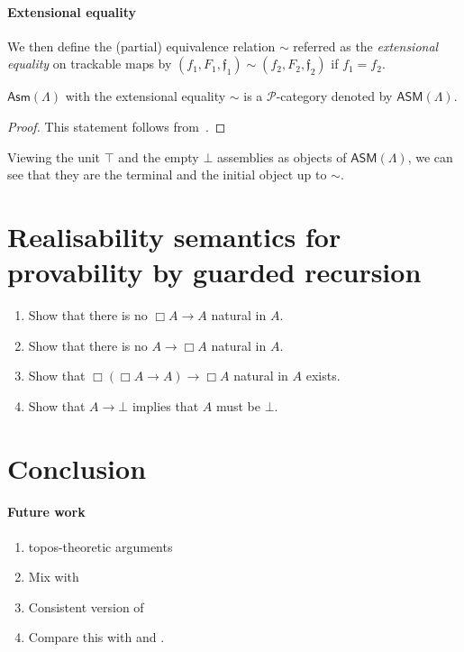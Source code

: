 \documentclass[a4paper,UKenglish,numberwithinsect,cleveref,thm-restate]{lipics-v2021}
\newcommand{\PP}{\mathscr{P}}
\newcommand{\Asm}{\mathsf{Asm}}
\newcommand{\ASM}{\mathsf{ASM}}
\theoremstyle{plain}
\begin{document}
\paragraph*{Extensional equality}
We then define the (partial) equivalence relation $\sim$ referred as the \emph{extensional equality} on trackable maps by $(f_1, F_1, \mathfrak{f}_1) \sim (f_2, F_2, \mathfrak{f}_2)$ if $f_1 = f_2$.
\begin{corollary}
  $\Asm(\Lambda)$ with the extensional equality $\sim$ is a $\PP$-category denoted by $\ASM(\Lambda)$.
\end{corollary}
\begin{proof}
  This statement follows from~.
\end{proof}

Viewing the unit $\top$ and the empty $\bot$ assemblies as objects of $\ASM(\Lambda)$, we can see that they are the terminal and the initial object up to $\sim$.

\section{Realisability semantics for provability by guarded recursion}\label{sec:provability}

\begin{enumerate}
  \item Show that there is no $\Box A \to A$ natural in $A$.
  \item Show that there is no $A \to \Box A$ natural in $A$.
  \item Show that $\Box (\Box A \to A) \to \Box A$ natural in $A$ exists.
  \item Show that $A \to \bot$ implies that $A$ must be $\bot$.
\end{enumerate}

\cite{Mogelberg2019a,Veltri2020}

\section{Conclusion}\label{sec:conclusion}
\paragraph*{Future work}
\begin{enumerate}
  \item topos-theoretic arguments
  \item Mix with \cite{Kavvos2017b}
  \item Consistent version of \cite{Kavvos2017b}
  \item Compare this with \cite{Shamkanov2014} and \cite{Shamkanov2016a}.
\end{enumerate}
\cite{Davies2001b}
\end{document}
